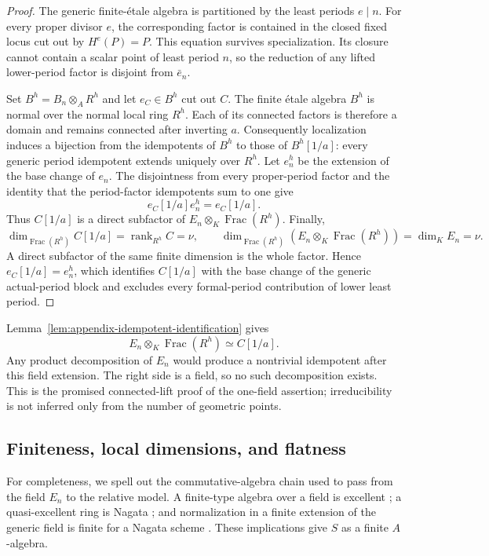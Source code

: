 \documentclass[11pt]{article}
\theoremstyle{definition}
\theoremstyle{remark}
\newcommand{\Frac}{\operatorname{Frac}}
\newcommand{\etale}{\'{e}tale}
\begin{document}
\begin{proof}
The generic finite-\etale{} algebra is partitioned by the least periods
$e\mid n$.  For every proper divisor $e$, the corresponding factor is
contained in the closed fixed locus cut out by $H^e(P)=P$.  This equation
survives specialization.  Its closure cannot contain a scalar point of least
period $n$, so the reduction of any lifted lower-period factor is disjoint
from $\bar e_n$.

Set $B^h=B_n\otimes_AR^h$ and let $e_C\in B^h$ cut out $C$.  The finite
\etale{} algebra $B^h$ is normal over the normal local ring $R^h$.  Each of
its connected factors is therefore a domain and remains connected after
inverting $a$.  Consequently localization induces a bijection from the
idempotents of $B^h$ to those of $B^h[1/a]$: every generic period idempotent
extends uniquely over $R^h$.  Let $e_n^h$ be the extension of the base change
of $e_n$.  The disjointness from every proper-period factor and the identity
that the period-factor idempotents sum to one give
\[
 e_C[1/a]e_n^h=e_C[1/a].
\]
Thus $C[1/a]$ is a direct subfactor of
$E_n\otimes_K\Frac(R^h)$.  Finally,
\[
 \dim_{\Frac(R^h)}C[1/a]=\operatorname{rank}_{R^h}C=\nu,
 \qquad
 \dim_{\Frac(R^h)}(E_n\otimes_K\Frac(R^h))=\dim_KE_n=\nu.
\]
A direct subfactor of the same finite dimension is the whole factor.  Hence
$e_C[1/a]=e_n^h$, which identifies $C[1/a]$ with the base change of the
generic actual-period block and excludes every formal-period contribution
of lower least period.
\end{proof}

Lemma~\ref{lem:appendix-idempotent-identification} gives
\[
 E_n\otimes_K\Frac(R^h)\simeq C[1/a].
\]
Any product decomposition of $E_n$ would produce a nontrivial idempotent
after this field extension.  The right side is a field, so no such
decomposition exists.  This is the promised connected-lift proof of the
one-field assertion; irreducibility is not inferred only from the number of
geometric points.

\subsection{Finiteness, local dimensions, and flatness}

For completeness, we spell out the commutative-algebra chain used to pass
from the field $E_n$ to the relative model.  A finite-type algebra over a
field is excellent \citep{stacks-07qw}; a quasi-excellent ring is Nagata
\citep{stacks-07qv}; and normalization in a finite extension of the generic
field is finite for a Nagata scheme \citep{stacks-035s}.  These implications
give $S$ as a finite $A$-algebra.
\end{document}
